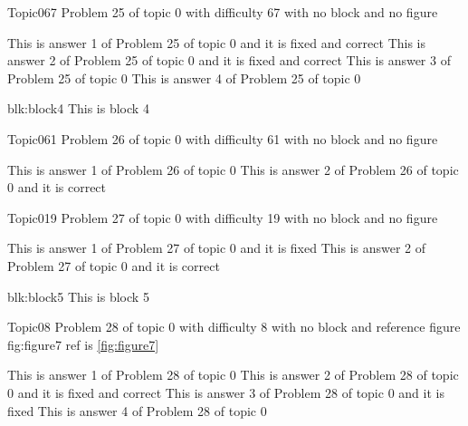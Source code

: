 \documentclass[master]{exam}
\begin{document}
\begin{problem}{Topic0}{67}
	Problem 25 of topic 0 with difficulty 67 with no block and no figure
	\begin{answers}
		 This is answer 1 of Problem 25 of topic 0 and it is fixed and correct
		 This is answer 2 of Problem 25 of topic 0 and it is fixed and correct
		\answer This is answer 3 of Problem 25 of topic 0 
		\answer This is answer 4 of Problem 25 of topic 0 
	\end{answers}
\end{problem}



\begin{block}{blk:block4}
This is block 4
\end{block}


\begin{problem}{Topic0}{61}
	Problem 26 of topic 0 with difficulty 61 with no block and no figure
	\begin{answers}
		\answer This is answer 1 of Problem 26 of topic 0 
		\answer[correct] This is answer 2 of Problem 26 of topic 0 and it is correct
	\end{answers}
\end{problem}

\begin{problem}{Topic0}{19}
	Problem 27 of topic 0 with difficulty 19 with no block and no figure
	\begin{answers}
		\answer[fixed] This is answer 1 of Problem 27 of topic 0 and it is fixed
		\answer[correct] This is answer 2 of Problem 27 of topic 0 and it is correct
	\end{answers}
\end{problem}



\begin{block}{blk:block5}
This is block 5
\end{block}


\begin{problem}{Topic0}{8}
	Problem 28 of topic 0 with difficulty 8 with no block and reference figure fig:figure7 ref is \ref{fig:figure7}
	\begin{answers}
		\answer This is answer 1 of Problem 28 of topic 0 
		 This is answer 2 of Problem 28 of topic 0 and it is fixed and correct
		\answer[fixed] This is answer 3 of Problem 28 of topic 0 and it is fixed
		\answer This is answer 4 of Problem 28 of topic 0 
	\end{answers}
\end{problem}
\end{document}
